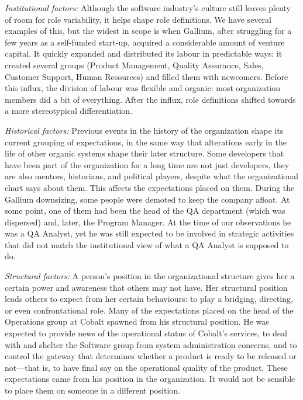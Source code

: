 \documentclass[10pt, conference, compsocconf]{IEEEtran}
\begin{document}
\emph{Institutional factors:} Although the software industry's culture still leaves plenty of room for role variability, it helps shape role definitions. We have several examples of this, but the widest in scope is when Gallium, after struggling for a few years as a self-funded start-up, acquired a considerable amount of venture capital. It quickly expanded and distributed its labour in predictable ways: it created several groups (Product Management, Quality Assurance, Sales, Customer Support, Human Resources) and filled them with newcomers. Before this influx, the division of labour was flexible and organic: most organization members did a bit of everything. After the influx, role definitions shifted towards a more stereotypical differentiation.

\emph{Historical factors:} Previous events in the history of the organization shape its current grouping of expectations, in the same way that alterations early in the life of other organic systems shape their later structure. Some developers that have been part of the organization for a long time are not just developers, they are also mentors, historians, and political players, despite what the organizational chart says about them. This affects the expectations placed on them. During the Gallium downsizing, some people were demoted to keep the company afloat. At some point, one of them had been the head of the QA department (which was dispersed) and, later, the Program Manager. At the time of our observations he was a QA Analyst, yet he was still expected to be involved in strategic activities that did not match the institutional view of what a QA Analyst is supposed to do.

\emph{Structural factors:} A person's position in the organizational structure gives her a certain power and awareness that others may not have. Her structural position leads others to expect from her certain behaviours: to play a bridging, directing, or even confrontational role. Many of the expectations placed on the head of the Operations group at Cobalt spawned from his structural position. He was expected to provide news of the operational status of Cobalt's services, to deal with and shelter the Software group from system administration concerns, and to control the gateway that determines whether a product is ready to be released or not---that is, to have final say on the operational quality of the product. These expectations came from his position in the organization. It would not be sensible to place them on someone in a different position.
\end{document}
